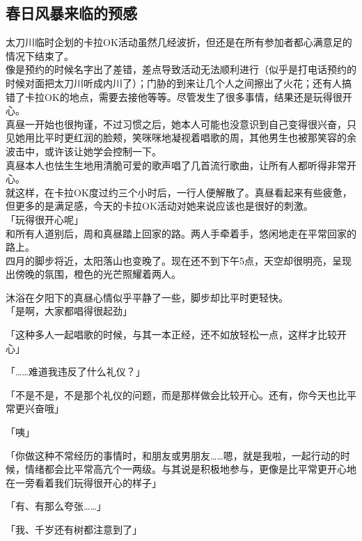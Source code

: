 \subsection{春日风暴来临的预感}

太刀川临时企划的卡拉OK活动虽然几经波折，但还是在所有参加者都心满意足的情况下结束了。\\

像是预约的时候名字出了差错，差点导致活动无法顺利进行（似乎是打电话预约的时候对面把太刀川听成内川了）；门胁的到来让几个人之间擦出了火花；还有人搞错了卡拉OK的地点，需要去接他等等。尽管发生了很多事情，结果还是玩得很开心。\\

真昼一开始也很拘谨，不过习惯之后，她本人可能也没意识到自己变得很兴奋，只见她用比平时更红润的脸颊，笑咪咪地凝视着唱歌的周，其他男生也被那笑容的余波击中，或许该让她学会控制一下。\\

真昼本人也怯生生地用清脆可爱的歌声唱了几首流行歌曲，让所有人都听得非常开心。\\

就这样，在卡拉OK度过约三个小时后，一行人便解散了。真昼看起来有些疲惫，但更多的是满足感，今天的卡拉OK活动对她来说应该也是很好的刺激。\\

「玩得很开心呢」\\

和所有人道别后，周和真昼踏上回家的路。两人手牵着手，悠闲地走在平常回家的路上。\\

四月的脚步将近，太阳落山也变晚了。现在还不到下午5点，天空却很明亮，呈现出傍晚的氛围，橙色的光芒照耀着两人。

沐浴在夕阳下的真昼心情似乎平静了一些，脚步却比平时更轻快。\\

「是啊，大家都唱得很起劲」

「这种多人一起唱歌的时候，与其一本正经，还不如放轻松一点，这样才比较开心」

「……难道我违反了什么礼仪？」

「不是不是，不是那个礼仪的问题，而是那样做会比较开心。还有，你今天也比平常更兴奋哦」

「咦」

「你做这种不常经历的事情时，和朋友或男朋友……嗯，就是我啦，一起行动的时候，情绪都会比平常高亢个一两级。与其说是积极地参与，更像是比平常更开心地在一旁看着我们玩得很开心的样子」

「有、有那么夸张……」

「我、千岁还有树都注意到了」

